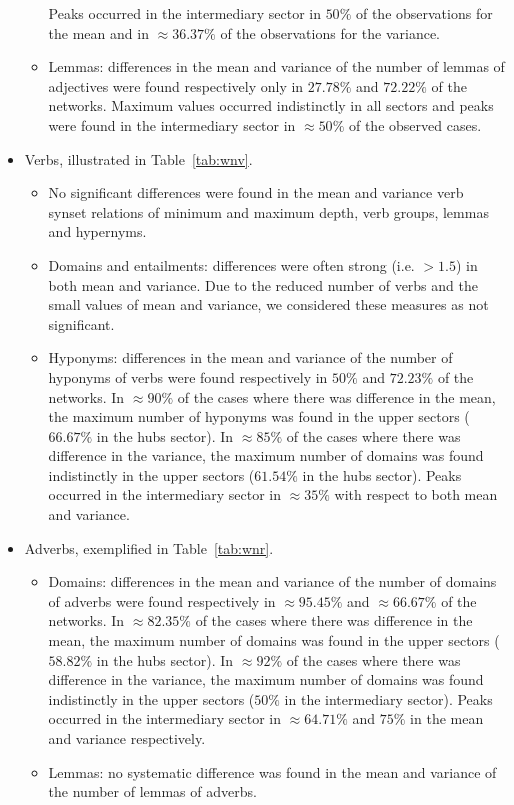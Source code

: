 \begin{itemize}
\begin{itemize}
Peaks occurred in the intermediary sector in $50\%$ of the observations for the mean
and in $\approx 36.37\%$ of the observations for the variance.
\item Lemmas:
differences in the mean and variance of the number of lemmas of adjectives were found respectively only in $27.78\%$ and $72.22\%$ of the networks.
Maximum values occurred indistinctly in all sectors and peaks were found in the intermediary sector in $\approx 50\%$ of the observed cases.

\FloatBarrier
\end{itemize}
\item Verbs, illustrated in Table~\ref{tab:wnv}.
\begin{itemize}
\item No significant differences were found in the mean and variance verb synset relations of minimum and maximum depth, verb groups, lemmas and hypernyms.
\item Domains and entailments:
differences were often strong (i.e. $>1.5$) in both mean and variance.
Due to the reduced number of verbs and the small values of mean and variance,
we considered these measures as not significant.
\item Hyponyms:
differences in the mean and variance of the number of hyponyms of verbs were found respectively in $50\%$ and $72.23\%$ of the networks.
In $\approx 90\%$ of the cases where there was difference in the mean, 
the maximum number of hyponyms was found in the upper sectors ($66.67\%$ in the hubs sector).
In $\approx 85\%$ of the cases where there was difference in the variance, 
the maximum number of domains was found indistinctly in the upper sectors ($61.54\%$ in the hubs sector).
Peaks occurred in the intermediary sector in $\approx 35\%$ with respect to both mean and variance.

\FloatBarrier
\end{itemize}
\item Adverbs, exemplified in Table~\ref{tab:wnr}.
\begin{itemize}
\item Domains:
differences in the mean and variance of the number of domains of adverbs were found respectively in $\approx 95.45\%$ and $\approx 66.67\%$ of the networks.
In $\approx 82.35\%$ of the cases where there was difference in the mean, 
the maximum number of domains was found in the upper sectors ($58.82\%$ in the hubs sector).
In $\approx 92\%$ of the cases where there was difference in the variance, 
the maximum number of domains was found indistinctly in the upper sectors ($50\%$ in the intermediary sector).
Peaks occurred in the intermediary sector in $\approx 64.71\%$ and $75\%$ in the mean and variance respectively.
\item Lemmas:
no systematic difference was found in the mean and variance of the number of lemmas of adverbs.

\FloatBarrier
\end{itemize}
\end{itemize}


